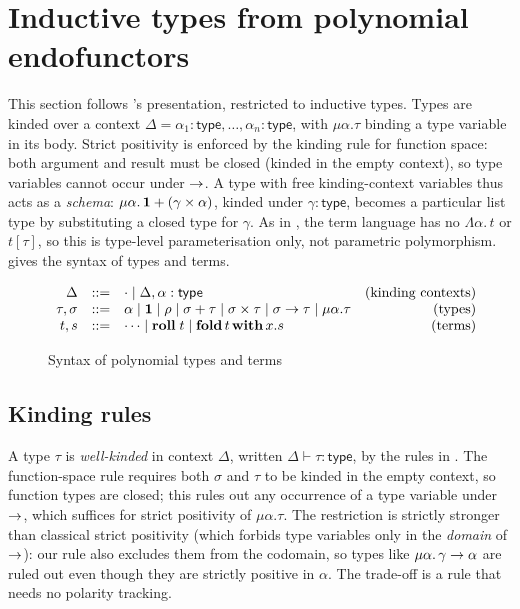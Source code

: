 \section{Inductive types from polynomial endofunctors}
\label{sec:polynomial-types}

This section follows \citet{nunes2023}'s presentation, restricted to inductive types. Types are kinded
over a context $\Delta = \alpha_1 : \mathsf{type}, \ldots, \alpha_n : \mathsf{type}$, with $\mu\alpha.\tau$
binding a type variable in its body. Strict positivity is enforced by the kinding rule for function space:
both argument and result must be closed (kinded in the empty context), so type variables cannot occur under
$\to$. A type with free kinding-context variables thus acts as a \emph{schema}: $\mu\alpha.\,\mathbf{1}
+ (\gamma \times \alpha)$, kinded under $\gamma : \mathsf{type}$, becomes a particular list type by
substituting a closed type for $\gamma$. As in \citet{nunes2023}, the term language has no $\Lambda\alpha.\,
t$ or $t[\tau]$, so this is type-level parameterisation only, not parametric polymorphism.
 gives the syntax of types and terms.

\begin{figure}
\[
\begin{array}{rclr}
   \Delta &::=& \cdot \mid \Delta, \alpha : \mathsf{type} & \text{(kinding contexts)} \\
   \tau, \sigma &::=& \alpha \mid \mathbf{1} \mid \rho \mid \sigma + \tau \mid \sigma \times \tau \mid
                      \sigma \to \tau \mid \mu\alpha.\tau & \text{(types)} \\
   t, s &::=& \cdots \mid \mathbf{roll}\;t \mid \mathbf{fold}\,t\,\mathbf{with}\,x.s & \text{(terms)}
\end{array}
\]
\caption{Syntax of polynomial types and terms}
\label{fig:polynomial-types:syntax}
\end{figure}

\subsection{Kinding rules}
\label{sec:polynomial-types:kinding}

A type $\tau$ is \emph{well-kinded} in context $\Delta$, written $\Delta \vdash \tau : \mathsf{type}$, by
the rules in . The function-space rule requires both $\sigma$ and $\tau$ to
be kinded in the empty context, so function types are closed; this rules out any occurrence of a type
variable under $\to$, which suffices for strict positivity of $\mu\alpha.\tau$. The restriction is
strictly stronger than classical strict positivity (which forbids type variables only in the \emph{domain}
of $\to$): our rule also excludes them from the codomain, so types like $\mu\alpha.\,\gamma \to \alpha$
are ruled out even though they are strictly positive in $\alpha$. The trade-off is a rule that needs no
polarity tracking.

